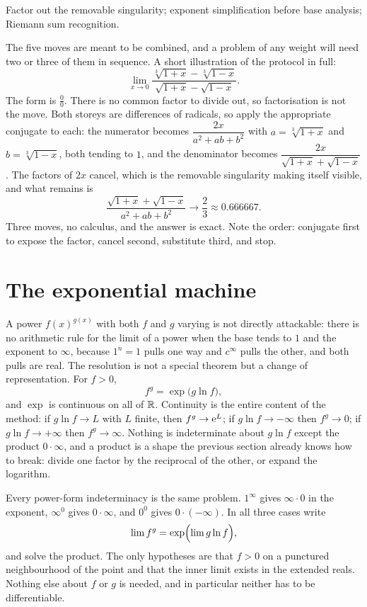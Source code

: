 \begin{seealsob}Factor out the removable singularity; exponent simplification before base analysis; Riemann sum recognition.\end{seealsob}

The five moves are meant to be combined, and a problem of any weight will need two or three of them in sequence. A short illustration of the protocol in full:
\[\lim_{x\to0}\frac{\sqrt[3]{1+x}-\sqrt[3]{1-x}}{\sqrt{1+x}-\sqrt{1-x}}.\]
The form is $\tfrac00$. There is no common factor to divide out, so factorisation is not the move. Both storeys are differences of radicals, so apply the appropriate conjugate to each: the numerator becomes $\dfrac{2x}{a^{2}+ab+b^{2}}$ with $a=\sqrt[3]{1+x}$ and $b=\sqrt[3]{1-x}$, both tending to $1$, and the denominator becomes $\dfrac{2x}{\sqrt{1+x}+\sqrt{1-x}}$. The factors of $2x$ cancel, which is the removable singularity making itself visible, and what remains is
\[\frac{\sqrt{1+x}+\sqrt{1-x}}{a^{2}+ab+b^{2}}\longrightarrow\frac{2}{3}\approx0.666667 .\]
Three moves, no calculus, and the answer is exact. Note the order: conjugate first to expose the factor, cancel second, substitute third, and stop.

\section{The exponential machine}

A power $f(x)^{g(x)}$ with both $f$ and $g$ varying is not directly attackable: there is no arithmetic rule for the limit of a power when the base tends to $1$ and the exponent to $\infty$, because $1^{n}=1$ pulls one way and $c^{\infty}$ pulls the other, and both pulls are real. The resolution is not a special theorem but a change of representation. For $f>0$,
\[f^{g}=\exp\bigl(g\ln f\bigr),\]
and $\exp$ is continuous on all of $\mathbb{R}$. Continuity is the entire content of the method: if $g\ln f\to L$ with $L$ finite, then $f^{g}\to \mathrm{e}^{L}$; if $g\ln f\to-\infty$ then $f^{g}\to0$; if $g\ln f\to+\infty$ then $f^{g}\to\infty$. Nothing is indeterminate about $g\ln f$ except the product $0\cdot\infty$, and a product is a shape the previous section already knows how to break: divide one factor by the reciprocal of the other, or expand the logarithm.

\begin{keynote}
Every power-form indeterminacy is the same problem. $1^{\infty}$ gives $\infty\cdot 0$ in the exponent, $\infty^{0}$ gives $0\cdot\infty$, and $0^{0}$ gives $0\cdot(-\infty)$. In all three cases write
\[\lim f^{g}=\exp\Bigl(\lim g\ln f\Bigr),\]
and solve the product. The only hypotheses are that $f>0$ on a punctured neighbourhood of the point and that the inner limit exists in the extended reals. Nothing else about $f$ or $g$ is needed, and in particular neither has to be differentiable.
\end{keynote}

